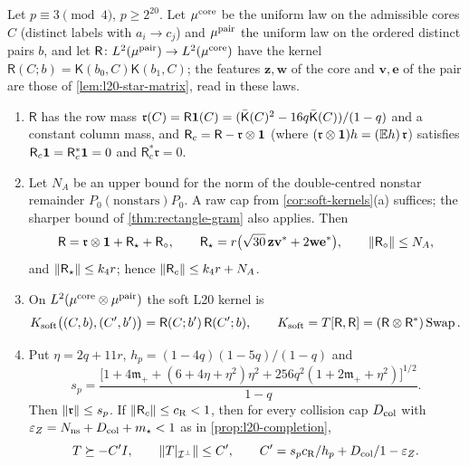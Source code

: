 \begin{proposition}\label{prop:l20-rectangular}
Let $p\equiv3\pmod4$, $p\ge2^{20}$. Let $\mu^{\rm core}$ be the uniform law on the
admissible cores $C$ (distinct labels with $a_i\to c_j$) and $\mu^{\rm pair}$ the
uniform law on the ordered distinct pairs $b$, and let
$\mathsf R\colon L^2(\mu^{\rm pair})\to L^2(\mu^{\rm core})$ have the kernel
$\mathsf R(C;b)=\mathsf K(b_0,C)\mathsf K(b_1,C)$; the features $\mathbf z,\mathbf w$
of the core and $\mathbf v,\mathbf e$ of the pair are those of
\cref{lem:l20-star-matrix}, read in these laws.
\begin{enumerate}[label=\textup{(\alph*)}]
\item $\mathsf R$ has the row mass
 $\mathfrak r(C)=\mathsf R\mathbf 1(C)=(\bar{\mathsf K}(C)^2-16q\bar{\mathsf K}(C))/(1-q)$
 and a constant column mass, and $\mathsf R_c=\mathsf R-\mathfrak r\otimes\mathbf 1$
 (where $(\mathfrak r\otimes\mathbf 1)h=(\mathbb E h)\,\mathfrak r$) satisfies
 $\mathsf R_c\mathbf 1=\mathsf R_c^*\mathbf 1=0$ and $\mathsf R_c^*\mathfrak r=0$.
\item Let $N_A$ be an upper bound for the norm of the double-centred
 nonstar remainder
 $P_0(\text{nonstars})P_0$. A raw cap from
 \cref{cor:soft-kernels}(a) suffices; the sharper bound of
 \cref{thm:rectangle-gram} also applies. Then
 \begin{equation}\label{eq:l20-rectangle}
  \mathsf R=\mathfrak r\otimes\mathbf 1+\mathsf R_\star+\mathsf R_\circ,\qquad
  \mathsf R_\star=r\bigl(\sqrt{30}\,\mathbf z\mathbf v^*+2\mathbf w\mathbf e^*\bigr),\qquad
  \left\|\mathsf R_\circ\right\|\le N_A ,
 \end{equation}
 and $\left\|\mathsf R_\star\right\|\le k_4r$; hence $\left\|\mathsf R_c\right\|\le k_4r+N_A$.
\item On $L^2(\mu^{\rm core}\otimes\mu^{\rm pair})$ the soft L20 kernel is
 \begin{equation}\label{eq:l20-swap}
  K_{\rm soft}\bigl((C,b),(C',b')\bigr)=\mathsf R(C;b')\,\mathsf R(C';b),\qquad
  K_{\rm soft}=T[\mathsf R,\mathsf R]=(\mathsf R\otimes\mathsf R^*)\operatorname{Swap}.
 \end{equation}
\item Put $\eta=2q+11r$, $h_p=(1-4q)(1-5q)/(1-q)$ and
 \[
  s_p=\frac{\bigl[1+4\mathfrak m_++(6+4\eta+\eta^2)\eta^2
  +256q^2(1+2\mathfrak m_++\eta^2)\bigr]^{1/2}}{1-q}.
 \]
 Then $\left\|\mathfrak r\right\|\le s_p$. If $\left\|\mathsf R_c\right\|\le c_{\rm R}<1$, then for
 every collision cap $D_{\rm col}$ with $\varepsilon_Z=N_{\rm ns}+D_{\rm col}+m_\star<1$
 as in \cref{prop:l20-completion},
 \[
  T\succeq-C'I,\qquad\left\|T|_{\mathcal I^\perp}\right\|\le C',\qquad
  C'=s_pc_{\rm R}/h_p+D_{\rm col}/1-\varepsilon_Z.
 \]
\end{enumerate}
\end{proposition}

